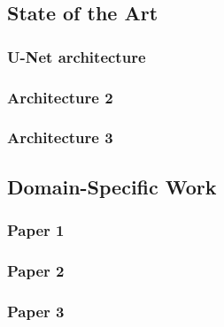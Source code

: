 \subsection{State of the Art}
\label{sec:cnn-architectures}
  \subsubsection{U-Net architecture}
  \subsubsection{Architecture 2}
  \subsubsection{Architecture 3}

\subsection{Domain-Specific Work}
\label{sec:remote-sensing-research}
  \subsubsection{Paper 1}
  \subsubsection{Paper 2}
  \subsubsection{Paper 3}
